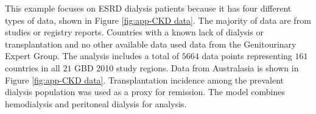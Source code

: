 This example focuses on ESRD dialysis patients because it has four
different types of data, shown in Figure \ref{fig:app-CKD data}.  The
majority of data are from studies or registry reports.  Countries with
a known lack of dialysis or transplantation and no other available data 
used data from the Genitourinary Expert Group.  The analysis
includes a total of $5664$ data points representing $161$ countries in
all $21$ GBD 2010 study regions.  Data from Australasia is shown in 
Figure \ref{fig:app-CKD data}.
Transplantation incidence among the prevalent
dialysis population was used as a proxy for remission.  The model
combines hemodialysis and peritoneal dialysis for analysis.

